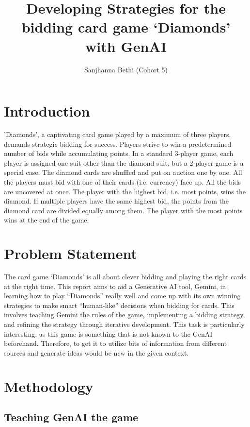 \documentclass{article}
\title{\textbf{Developing Strategies for the bidding card game ‘Diamonds’ with GenAI}}
\author{\Large Sanjhanna Bethi (Cohort 5)}
\begin{document}
\maketitle
\section{Introduction}

'Diamonds', a captivating card game played by a maximum of three players, demands strategic bidding for success. Players strive to win a predetermined number of bids while accumulating points. In a standard 3-player game, each player is assigned one suit other than the diamond suit, but a 2-player game is a special case. The diamond cards are shuffled and put on auction one by one. All the players must bid with one of their cards (i.e. currency) face up. All the bids are uncovered at once. The player with the highest bid, i.e. most points, wins the diamond. If multiple players have the same highest bid, the points from the diamond card are divided equally among them. The player with the most points wins at the end of the game.

\vspace{7pt}
\section{Problem Statement}

The card game ‘Diamonds’ is all about clever bidding and playing the right cards at the right time. This report aims to aid a Generative AI tool, Gemini, in learning how to play “Diamonds” really well and come up with its own winning strategies to make smart “human-like” decisions when bidding for cards. This involves teaching Gemini the rules of the game, implementing a bidding strategy, and refining the strategy through iterative development. 
This task is particularly interesting, as this game is something that is not known to the GenAI beforehand. Therefore, to get it to utilize bits of information from different sources and generate ideas would be new in the given context.

\vspace{7pt}
\section{Methodology}
\vspace{5pt}
\subsection{Teaching GenAI the game}
\end{document}
